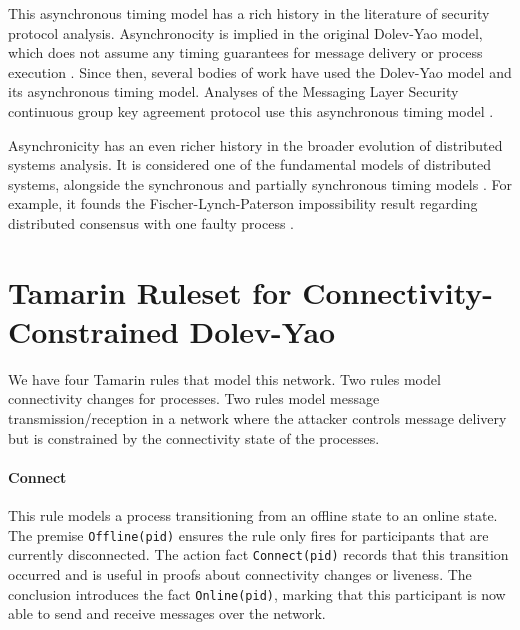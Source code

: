 \documentclass{article}
\begin{document}
This asynchronous timing model has a rich history in the literature of security protocol analysis.
Asynchronocity is implied in the original Dolev-Yao model, which does not assume any timing guarantees for message delivery or process execution \cite{Dolev_1983_SecurityPublicKey}.
Since then, several bodies of work have used the Dolev-Yao model and its asynchronous timing model.
Analyses of the Messaging Layer Security continuous group key agreement protocol use this asynchronous timing model \cite{CohnGordon_2018_EndstoEnds, Alwen_2020_Security, Brzuska_2022_Security}.

Asynchronicity has an even richer history in the broader evolution of distributed systems analysis.
It is considered one of the fundamental models of distributed systems, alongside the synchronous and partially synchronous timing models \cite{Lynch_1996_DistributedAlgorithms}.
For example, it founds the Fischer-Lynch-Paterson impossibility result regarding distributed consensus with one faulty process \cite{Fischer_1985_Impossibility}.

\section{Tamarin Ruleset for Connectivity-Constrained Dolev-Yao}

We have four Tamarin rules that model this network.
Two rules model connectivity changes for processes.
Two rules model message transmission/reception in a network where the attacker controls message delivery but is constrained by the connectivity state of the processes.

\paragraph{Connect} This rule models a process transitioning from an offline 
state to an online state. The premise \texttt{Offline(pid)} ensures the rule only fires 
for participants that are currently disconnected. The action fact \texttt{Connect(pid)} 
records that this transition occurred and is useful in proofs about connectivity 
changes or liveness. The conclusion introduces the fact \texttt{Online(pid)}, marking 
that this participant is now able to send and receive messages over the network.

\begin{minipage}{\linewidth}

\end{minipage}
\end{document}
